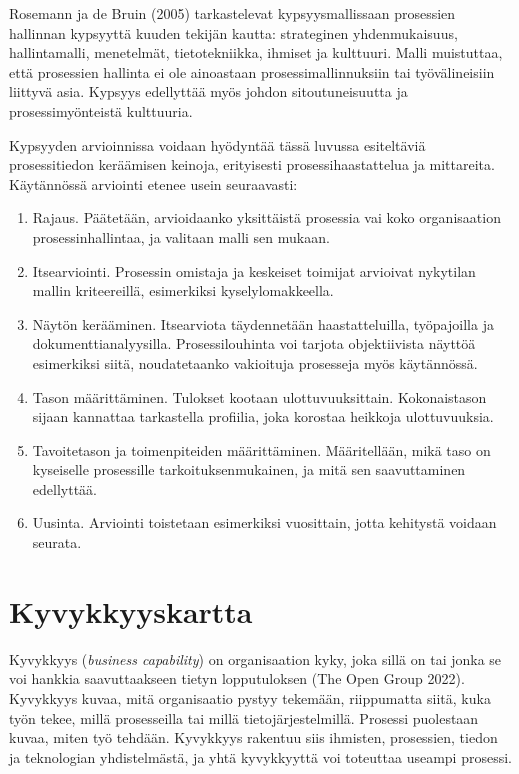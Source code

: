 \documentclass[
  finnish,
  letterpaper,
  DIV=11,
  numbers=noendperiod,
  oneside]{scrreprt}
\providecommand{\tightlist}{%
  \setlength{\itemsep}{0pt}\setlength{\parskip}{0pt}}
\begin{document}
Rosemann ja de Bruin (2005) tarkastelevat kypsyysmallissaan prosessien
hallinnan kypsyyttä kuuden tekijän kautta: strateginen yhdenmukaisuus,
hallintamalli, menetelmät, tietotekniikka, ihmiset ja kulttuuri. Malli
muistuttaa, että prosessien hallinta ei ole ainoastaan
prosessimallinnuksiin tai työvälineisiin liittyvä asia. Kypsyys
edellyttää myös johdon sitoutuneisuutta ja prosessimyönteistä
kulttuuria.

Kypsyyden arvioinnissa voidaan hyödyntää tässä luvussa esiteltäviä
prosessitiedon keräämisen keinoja, erityisesti prosessihaastattelua ja
mittareita. Käytännössä arviointi etenee usein seuraavasti:

\begin{enumerate}
\def\labelenumi{\arabic{enumi}.}
\tightlist
\item
  Rajaus. Päätetään, arvioidaanko yksittäistä prosessia vai koko
  organisaation prosessinhallintaa, ja valitaan malli sen mukaan.
\item
  Itsearviointi. Prosessin omistaja ja keskeiset toimijat arvioivat
  nykytilan mallin kriteereillä, esimerkiksi kyselylomakkeella.
\item
  Näytön kerääminen. Itsearviota täydennetään haastatteluilla,
  työpajoilla ja dokumenttianalyysilla. Prosessilouhinta voi tarjota
  objektiivista näyttöä esimerkiksi siitä, noudatetaanko vakioituja
  prosesseja myös käytännössä.
\item
  Tason määrittäminen. Tulokset kootaan ulottuvuuksittain. Kokonaistason
  sijaan kannattaa tarkastella profiilia, joka korostaa heikkoja
  ulottuvuuksia.
\item
  Tavoitetason ja toimenpiteiden määrittäminen. Määritellään, mikä taso
  on kyseiselle prosessille tarkoituksenmukainen, ja mitä sen
  saavuttaminen edellyttää.
\item
  Uusinta. Arviointi toistetaan esimerkiksi vuosittain, jotta kehitystä
  voidaan seurata.
\end{enumerate}

\section{Kyvykkyyskartta}\label{kyvykkyyskartta}

Kyvykkyys (\emph{business capability}) on organisaation kyky, joka sillä
on tai jonka se voi hankkia saavuttaakseen tietyn lopputuloksen (The
Open Group 2022). Kyvykkyys kuvaa, mitä organisaatio pystyy tekemään,
riippumatta siitä, kuka työn tekee, millä prosesseilla tai millä
tietojärjestelmillä. Prosessi puolestaan kuvaa, miten työ tehdään.
Kyvykkyys rakentuu siis ihmisten, prosessien, tiedon ja teknologian
yhdistelmästä, ja yhtä kyvykkyyttä voi toteuttaa useampi prosessi.
\end{document}
